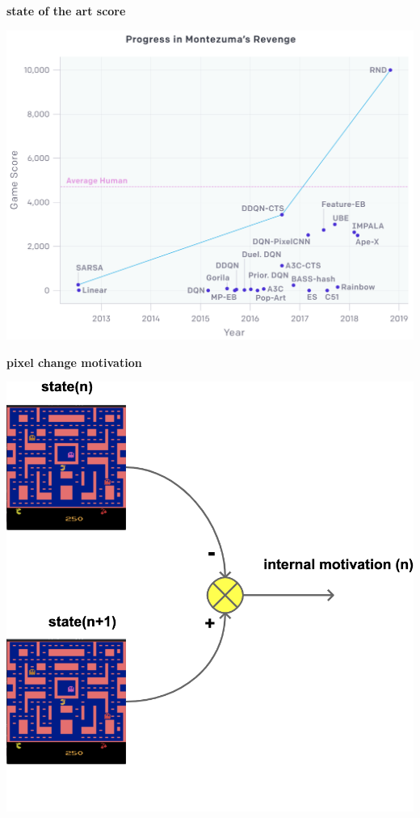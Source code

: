 \documentclass[xcolor=dvipsnames]{beamer}
\begin{document}
\begin{frame}{\bf state of the art score}

\centering
\includegraphics[scale=0.2]{../images/montezuma_progress.png}


\end{frame}


\begin{frame}{\bf pixel change motivation}

\centering
\includegraphics[scale=0.15]{../diagrams/internal_motivation/pixelchange.png}

\end{frame}
\end{document}
